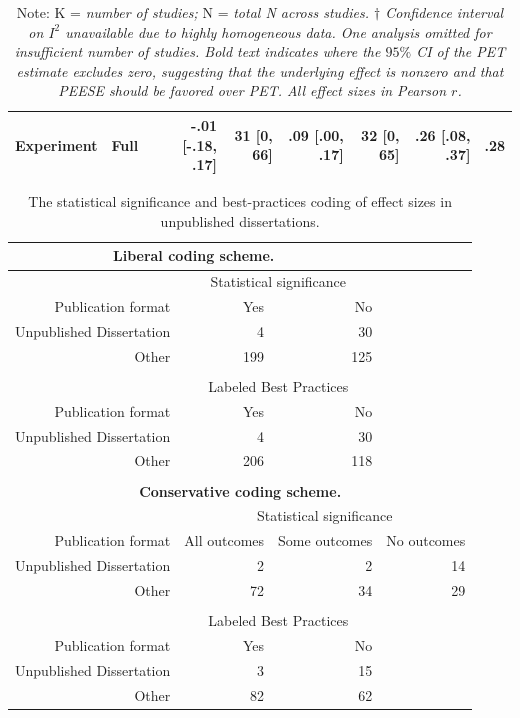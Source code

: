 \documentclass[man]{apa6}
\begin{document}
\begin{table}[htbp]
\begin{tabular}{rrrrrrrr}
		Experiment & Full  & -.01 [-.18, .17] & 31 [0, 66] & .09 [.00, .17] & 32 [0, 65] & .26 [.08, .37] & .28 \\
		\bottomrule
	\end{tabular}%
	\label{table:adjustment}%
	\caption*{Note: K = {\em number of studies;} N = {\em total N across studies. $\dagger$ Confidence interval on $I^2$ unavailable due to highly homogeneous data. One analysis omitted for insufficient number of studies. Bold text indicates where the $95\%$ CI of the PET estimate excludes zero, suggesting that the underlying effect is nonzero and that PEESE should be favored over PET. All effect sizes in Pearson $r$.}}
\end{table}%

\begin{table}[htbp]
	\small
	\centering
	\caption{The statistical significance and best-practices coding of effect sizes in unpublished dissertations.}
	\begin{tabular}{rrrr}
		\toprule
		\multicolumn{3}{c}{\textbf{Liberal coding scheme.}} &  \\
		\midrule
		& \multicolumn{2}{c}{Statistical significance} &  \\
		Publication format & Yes   & No    &  \\
		Unpublished Dissertation & 4     & 30    &  \\
		Other & 199   & 125   &  \\
		&       &       &  \\
		& \multicolumn{2}{c}{Labeled Best Practices} &  \\
		Publication format & Yes   & No    &  \\
		Unpublished Dissertation & 4     & 30    &  \\
		Other & 206   & 118   &  \\
		&       &       &  \\
		\multicolumn{4}{c}{\textbf{Conservative coding scheme.}} \\
		& \multicolumn{3}{c}{Statistical significance} \\
		Publication format & All outcomes   & Some outcomes & No outcomes \\
		Unpublished Dissertation & 2     & 2     & 14 \\
		Other & 72    & 34    & 29 \\
		&       &       &  \\
		& \multicolumn{2}{c}{Labeled Best Practices} &  \\
		Publication format & Yes   & No    &  \\
		Unpublished Dissertation & 3     & 15    &  \\
		Other & 82    & 62    &  \\
		\bottomrule
	\end{tabular}%
	\label{table:dissertations}%
\end{table}
\end{document}
